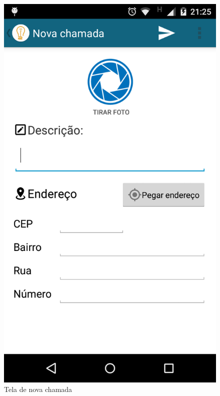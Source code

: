 \documentclass[
	article,			%
	11pt,				%
	oneside,			%
	a4paper,			%
	english,			%
	brazil,				%
	sumario=tradicional
	]{abntex2}
\begin{document}
\begin{figure}[!htbp]
\begin{minipage}{0.4\textwidth}
  \end{minipage}
  \hfill
  \begin{minipage}{0.4\textwidth}
    \centering
    \caption{\label{android-tela-nova-chamada}Tela de nova chamada}
    \includegraphics[scale=0.1]{android/2.png}
  \end{minipage}
\end{figure}
\end{document}
